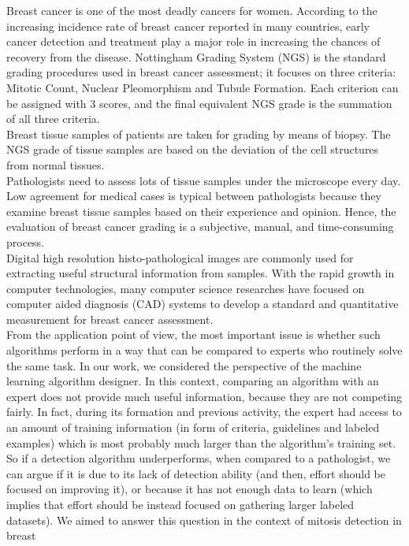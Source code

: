 Breast cancer is one of the most deadly cancers for women. According to the increasing incidence rate of breast
cancer reported in many countries, early cancer detection and treatment play a major role
in increasing the chances of recovery from the disease. Nottingham Grading
System (\Gls{NGS}) is the standard grading procedures used in breast cancer assessment;
it focuses on three criteria: Mitotic Count, Nuclear Pleomorphism and
Tubule Formation. Each criterion can be assigned with 3 scores, and the final
equivalent NGS grade is the summation of all three criteria.\\
Breast tissue samples of patients are taken for grading by means of biopsy. The \Gls{NGS} grade
of tissue samples are based on the deviation of the cell structures from normal
tissues.\\
Pathologists need to assess lots of tissue samples under the microscope every day.
Low agreement for medical cases is typical between pathologists
because they examine breast tissue samples based on their experience and opinion.
Hence, the evaluation of breast cancer grading is a subjective, manual, and
time-consuming process.\\
Digital high resolution histo-pathological images are commonly used for extracting useful structural information from samples.
With the rapid growth in computer technologies, many computer science researches have
focused on computer aided diagnosis (\Gls{CAD}) systems to develop a standard and
quantitative measurement for breast cancer assessment.\\
From the application point of view, the most important issue is whether such algorithms
perform in a way that can be compared to experts who routinely solve the same task.
In our work, we considered the perspective of the machine learning algorithm designer.
In this context, comparing an algorithm with an expert does not provide
much useful information, because they are not competing fairly. In fact, during
its formation and previous activity, the expert had access to an amount of training information (in form of criteria, guidelines and labeled examples) which is
most probably much larger than the algorithm's training set. So if a detection algorithm underperforms, when compared to a pathologist,
we can argue if it is due to its lack of detection ability (and then, effort should be
focused on improving it), or because it has not enough data to learn (which implies that effort should be instead focused on gathering larger labeled datasets).
We aimed to answer this question in the context of mitosis detection in breast
